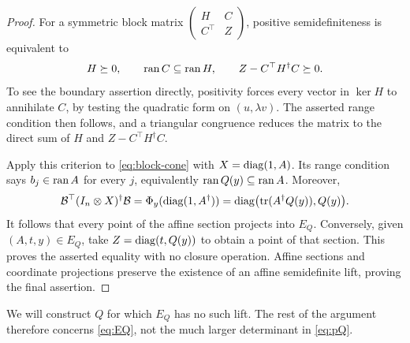 \begin{proof}
For a symmetric block matrix
$\left(\begin{smallmatrix}H&C\\C^\top&Z\end{smallmatrix}\right)$,
positive semidefiniteness is equivalent to
\[
 H\succeq0,\qquad \operatorname{ran} C\subseteq\operatorname{ran} H,\qquad
 Z-C^\top H^\dagger C\succeq0.
\]
To see the boundary assertion directly, positivity forces every
vector in $\ker H$ to annihilate $C$, by testing the quadratic form
on $(u,\lambda v)$. The asserted range condition then follows, and
a triangular congruence reduces the matrix to the direct sum of
$H$ and $Z-C^\top H^\dagger C$.

Apply this criterion to \eqref{eq:block-cone} with $X=\operatorname{diag}(1,A)$.
Its range condition says $b_j\in\operatorname{ran} A$ for every $j$, equivalently
$\operatorname{ran} Q(y)\subseteq\operatorname{ran} A$. Moreover,
\[
 \mathcal B^\top(I_n\otimes X)^\dagger\mathcal B
 =\Phi_y(\operatorname{diag}(1,A^\dagger))
 =\operatorname{diag}\bigl(\operatorname{tr}(A^\dagger Q(y)),Q(y)\bigr).
\]
It follows that every point of the affine section projects into
$E_Q$. Conversely, given $(A,t,y)\in E_Q$, take
$Z=\operatorname{diag}(t,Q(y))$ to obtain a point of that section. This proves
the asserted equality with no closure operation. Affine sections
and coordinate projections preserve the existence of an affine
semidefinite lift, proving the final assertion.
\end{proof}

We will construct $Q$ for which $E_Q$ has no such lift. The rest of
the argument therefore concerns \eqref{eq:EQ}, not the much larger
determinant in \eqref{eq:pQ}.
